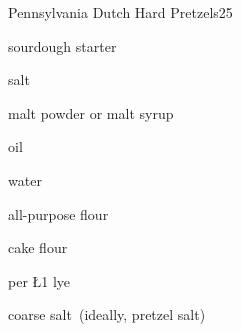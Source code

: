 \begin{recipe}{Pennsylvania Dutch Hard Pretzels}{}{25}

\begin{ingredients}
\item {} sourdough starter
\item {} salt
\item {} malt powder or malt syrup
\item {} oil
\item {} water
\item {} all-purpose flour
\item {} cake flour
\item {} per \L{1} lye
\item coarse salt~(ideally, pretzel salt)
\end{ingredients}


\end{recipe}
